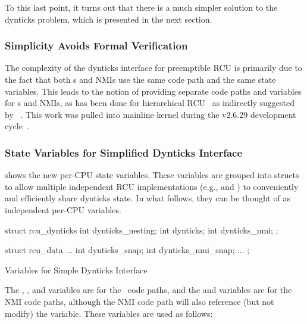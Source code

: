 To this last point, it turns out that there is a much simpler solution to
the dynticks problem, which is presented in the next section.

\subsubsection{Simplicity Avoids Formal Verification}
\label{sec:formal:Simplicity Avoids Formal Verification}

The complexity of the dynticks interface for preemptible RCU is primarily
due to the fact that both \IRQ s and NMIs use the same code path and the
same state variables.
This leads to the notion of providing separate code paths and variables
for \IRQ s and NMIs, as has been done for
hierarchical RCU~\cite{PaulEMcKenney2008HierarchicalRCU}
as indirectly suggested by
~\cite{ManfredSpraul2008StateMachineRCU}.
This work was pulled into mainline kernel during the v2.6.29
development cycle~\cite{PaulEMcKenney2008commit:64db4cfff99c}.

\subsubsection{State Variables for Simplified Dynticks Interface}
\label{sec:formal:State Variables for Simplified Dynticks Interface}

shows the new per-CPU state variables.
These variables are grouped into structs to allow multiple independent
RCU implementations (e.g.,  and ) to conveniently
and efficiently share dynticks state.
In what follows, they can be thought of as independent per-CPU variables.

\begin{listing}
\begin{VerbatimL}
struct rcu_dynticks {
	int dynticks_nesting;
	int dynticks;
	int dynticks_nmi;
};

struct rcu_data {
	...
	int dynticks_snap;
	int dynticks_nmi_snap;
	...
};
\end{VerbatimL}
\caption{Variables for Simple Dynticks Interface}
\label{lst:formal:Variables for Simple Dynticks Interface}
\end{listing}

The , , and  variables
are for the \IRQ\ code paths, and the  and
 variables are for the NMI code paths, although
the NMI code path will also reference (but not modify) the
 variable.
These variables are used as follows:

